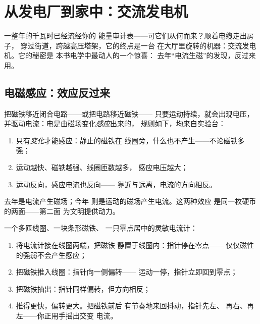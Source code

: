 \chapter{从发电厂到家中：交流发电机}\label{ch:g9:alternator}

一整年的千瓦时已经流经你的
能量审计表——可它们从何而来？顺着电缆走出房子，
穿过街道，跨越高压塔架，它的终点是一台
在大厅里旋转的机器：交流发电机。它的秘密是
本书电学中最动人的一个惊喜：
去年“电流生磁”的发现，反过来用。

\section{电磁感应：效应反过来}

\begin{proposition}[电磁感应]\label{prop:g9:alternator:induction}
把磁铁移近闭合电路——或把电路移近磁铁——
只要运动持续，就会出现电压，
并驱动电流：电是由磁场变化\emph{感应}出来的，
规则如下，均来自实验台：
\begin{enumerate}
  \item 只有\emph{变化}才能感应：静止的磁铁在
        线圈旁，什么也不产生——不论磁铁多强；
  \item 运动越快、磁铁越强、线圈匝数越多，
        感应电压越大；
  \item 运动反向，感应电流也反向——
        靠近与远离，电流的方向相反。
\end{enumerate}
去年是电流产生磁场；今年
则是运动的磁场产生电流。这两种效应
是同一枚硬币的两面——第二面
为文明提供动力。
\end{proposition}

\begin{method}[实验台上的感应]\label{met:g9:alternator:bench}
一个多匝线圈、一块条形磁铁、
一只零点居中的灵敏电流计：
\begin{enumerate}
  \item 将电流计接在线圈两端，把磁铁
        静置于线圈内：指针停在零点——
        仅仅磁性的强弱不会产生感应；
  \item 把磁铁推入线圈：指针向一侧偏转——
        运动一停，指针立即回到零点；
  \item 把磁铁抽出：指针同样偏转，但方向相反；
  \item 推得更快，偏转更大。把磁铁前后
        有节奏地来回抖动，指针先左、
        再右、再左——你正用手摇出交变
        电流。
\end{enumerate}
\end{method}

